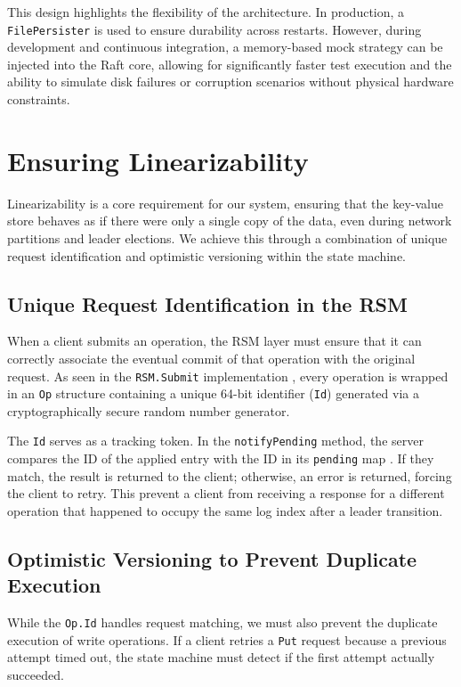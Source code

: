This design highlights the flexibility of the architecture. In production, a \texttt{FilePersister} is used to ensure durability across restarts. However, during development and continuous integration, a memory-based mock strategy can be injected into the Raft core, allowing for significantly faster test execution and the ability to simulate disk failures or corruption scenarios without physical hardware constraints.

\section{Ensuring Linearizability}
\label{sec:linearizability_impl}
Linearizability is a core requirement for our system, ensuring that the key-value store behaves as if there were only a single copy of the data, even during network partitions and leader elections. We achieve this through a combination of unique request identification and optimistic versioning within the state machine.

\subsection{Unique Request Identification in the RSM}
When a client submits an operation, the RSM layer must ensure that it can correctly associate the eventual commit of that operation with the original request. As seen in the \texttt{RSM.Submit} implementation \cite{rsm_go}, every operation is wrapped in an \texttt{Op} structure containing a unique 64-bit identifier (\texttt{Id}) generated via a cryptographically secure random number generator.

The \texttt{Id} serves as a tracking token. In the \texttt{notifyPending} method, the server compares the ID of the applied entry with the ID in its \texttt{pending} map \cite{rsm_go}. If they match, the result is returned to the client; otherwise, an error is returned, forcing the client to retry. This prevent a client from receiving a response for a different operation that happened to occupy the same log index after a leader transition.

\subsection{Optimistic Versioning to Prevent Duplicate Execution}
While the \texttt{Op.Id} handles request matching, we must also prevent the duplicate execution of write operations. If a client retries a \texttt{Put} request because a previous attempt timed out, the state machine must detect if the first attempt actually succeeded.

